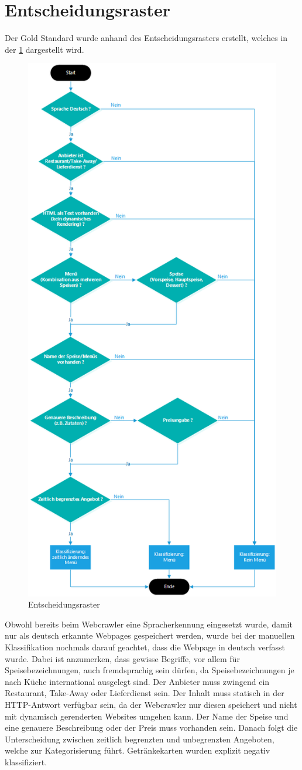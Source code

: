 \section{Entscheidungsraster}
\FloatBarrier
Der Gold Standard wurde anhand des Entscheidungsrasters erstellt, welches in der \cref{fig:classificationtree} dargestellt wird.
\begin{figure}	
	\includegraphics[width=0.65\columnwidth,keepaspectratio]{img/man-classification-tree.png}
	\caption{Entscheidungsraster}
	\label{fig:classificationtree}
\end{figure}
Obwohl bereits beim Webcrawler eine Spracherkennung eingesetzt wurde, damit nur als deutsch erkannte Webpages gespeichert werden, wurde bei der manuellen Klassifikation nochmals darauf geachtet, dass die Webpage in deutsch verfasst wurde.
Dabei ist anzumerken, dass gewisse Begriffe, vor allem für Speisebezeichnungen, auch fremdsprachig sein dürfen, da Speisebezeichnungen je nach Küche international ausgelegt sind.
Der Anbieter muss zwingend ein Restaurant, Take-Away oder Lieferdienst sein.
Der Inhalt muss statisch in der HTTP-Antwort verfügbar sein, da der Webcrawler nur diesen speichert und nicht mit dynamisch gerenderten Websites umgehen kann.
Der Name der Speise und eine genauere Beschreibung oder der Preis muss vorhanden sein.
Danach folgt die Unterscheidung zwischen zeitlich begrenzten und unbegrenzten Angeboten, welche zur Kategorisierung führt.
Getränkekarten wurden explizit negativ klassifiziert.
\FloatBarrier
